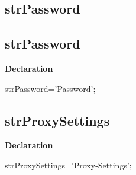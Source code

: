 \documentclass{report}
\newif\ifpdf
\begin{document}
\subsection*{\large{\textbf{strPassword}}\normalsize\hspace{1ex}\hrulefill}
\else
\subsection*{strPassword}
\fi
\label{trstrings-strPassword}
\begin{list}{}{
\setlength{\itemindent}{0cm}
\setlength{\listparindent}{0cm}
\setlength{\leftmargin}{\evensidemargin}
\addtolength{\leftmargin}{\tmplength}
\settowidth{\labelsep}{X}
\addtolength{\leftmargin}{\labelsep}
\setlength{\labelwidth}{\tmplength}
}
\item[\textbf{Declaration}\hfill]
\ifpdf
\begin{flushleft}
\fi
\begin{ttfamily}
strPassword='Password';\end{ttfamily}

\ifpdf
\end{flushleft}
\fi

\end{list}
\ifpdf
\subsection*{\large{\textbf{strProxySettings}}\normalsize\hspace{1ex}\hrulefill}
\else
\subsection*{strProxySettings}
\fi
\label{trstrings-strProxySettings}
\begin{list}{}{
\setlength{\itemindent}{0cm}
\setlength{\listparindent}{0cm}
\setlength{\leftmargin}{\evensidemargin}
\addtolength{\leftmargin}{\tmplength}
\settowidth{\labelsep}{X}
\addtolength{\leftmargin}{\labelsep}
\setlength{\labelwidth}{\tmplength}
}
\item[\textbf{Declaration}\hfill]
\ifpdf
\begin{flushleft}
\fi
\begin{ttfamily}
strProxySettings='Proxy-Settings';\end{ttfamily}

\ifpdf
\end{flushleft}
\fi

\end{list}
\ifpdf
\end{document}
